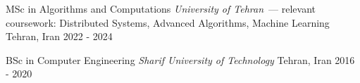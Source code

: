 

\begin{cvhonors}

  \cvhonor
    {\normalsize MSc in Algorithms and Computations}
    {\textit{University of Tehran}~--- relevant coursework: Distributed Systems, Advanced Algorithms, Machine Learning}
    {Tehran, Iran}
    {2022 - 2024}

  \cvhonor
    {\normalsize BSc in Computer Engineering}
    {\textit{Sharif University of Technology}}
    {Tehran, Iran}
    {2016 - 2020}

\end{cvhonors}
